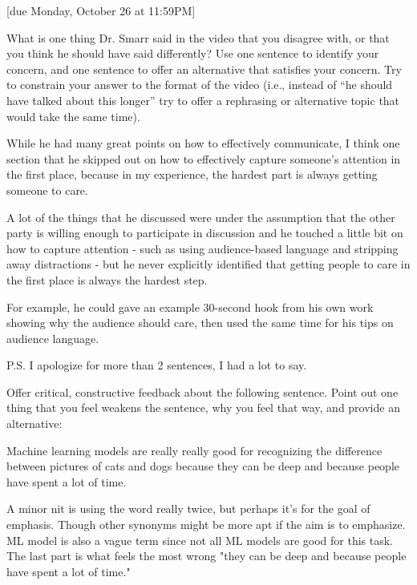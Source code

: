 \documentclass{article}
\begin{document}
[due Monday, October 26 at 11:59PM]

\begin{probset}
\begin{prob}
    What is one thing Dr. Smarr said in the video that you disagree with, or that you think he should have said differently? Use one sentence to identify your concern, and one sentence to offer an alternative that satisfies your concern. Try to constrain your answer to the format of the video (i.e., instead of “he should have talked about this longer” try to offer a rephrasing or alternative topic that would take the same time).

    \begin{soln}
        While he had many great points on how to effectively communicate, I think one section that he skipped out on how to effectively capture someone's attention in the first place, because in my experience, the hardest part is always getting someone to care. 
        
        A lot of the things that he discussed were under the assumption that the other party is willing enough to participate in discussion and he touched a little bit on how to capture attention - such as using audience-based language and stripping away distractions - but he never explicitly identified that getting people to care in the first place is always the hardest step.

        For example, he could gave an example 30-second hook from his own work showing why the audience should care, then used the same time for his tips on audience language.

        P.S. I apologize for more than 2 sentences, I had a lot to say.
    \end{soln}
\end{prob}

\begin{prob}
    Offer critical, constructive feedback about the following sentence. Point out one thing that you feel weakens the sentence, why you feel that way, and provide an alternative:

    Machine learning models are really really good for recognizing the difference between pictures of cats and dogs because they can be deep and because people have spent a lot of time.

    \begin{soln}
        A minor nit is using the word really twice, but perhaps it's for the goal of emphasis. Though other synonyms might be more apt if the aim is to emphasize. ML model is also a vague term since not all ML models are good for this task. The last part is what feels the most wrong "they can be deep and because people have spent a lot of time."


\end{soln}
\end{prob}
\end{probset}
\end{document}
